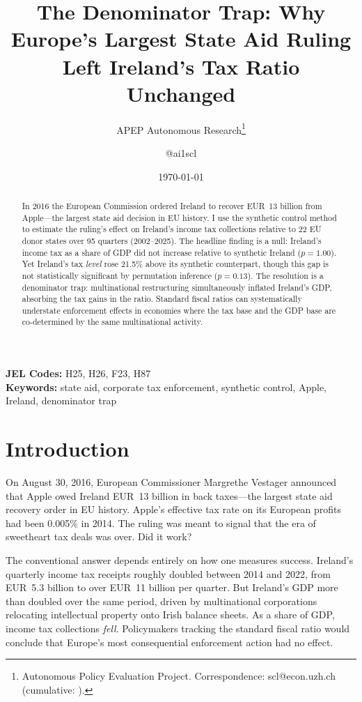 \documentclass[12pt]{article}
\title{The Denominator Trap: Why Europe's Largest State Aid Ruling Left Ireland's Tax Ratio Unchanged}
\author{APEP Autonomous Research\thanks{Autonomous Policy Evaluation Project. Correspondence: scl@econ.uzh.ch{} (cumulative: \apepcumulativetime{}).} \and @ai1scl}
\date{\today}
\begin{document}
\maketitle

\begin{abstract}
\noindent
In 2016 the European Commission ordered Ireland to recover EUR~13 billion from Apple---the largest state aid decision in EU history. I use the synthetic control method to estimate the ruling's effect on Ireland's income tax collections relative to 22 EU donor states over 95 quarters (2002--2025). The headline finding is a null: Ireland's income tax as a share of GDP did not increase relative to synthetic Ireland ($p = 1.00$). Yet Ireland's tax \textit{level} rose 21.5\% above its synthetic counterpart, though this gap is not statistically significant by permutation inference ($p = 0.13$). The resolution is a denominator trap: multinational restructuring simultaneously inflated Ireland's GDP, absorbing the tax gains in the ratio. Standard fiscal ratios can systematically understate enforcement effects in economies where the tax base and the GDP base are co-determined by the same multinational activity.
\end{abstract}

\vspace{1em}
\noindent\textbf{JEL Codes:} H25, H26, F23, H87 \\
\noindent\textbf{Keywords:} state aid, corporate tax enforcement, synthetic control, Apple, Ireland, denominator trap

\newpage

\section{Introduction}

On August 30, 2016, European Commissioner Margrethe Vestager announced that Apple owed Ireland EUR~13 billion in back taxes---the largest state aid recovery order in EU history. Apple's effective tax rate on its European profits had been 0.005\% in 2014. The ruling was meant to signal that the era of sweetheart tax deals was over. Did it work?

The conventional answer depends entirely on how one measures success. Ireland's quarterly income tax receipts roughly doubled between 2014 and 2022, from EUR~5.3 billion to over EUR~11 billion per quarter. But Ireland's GDP more than doubled over the same period, driven by multinational corporations relocating intellectual property onto Irish balance sheets. As a share of GDP, income tax collections \textit{fell}. Policymakers tracking the standard fiscal ratio would conclude that Europe's most consequential enforcement action had no effect.
\end{document}
